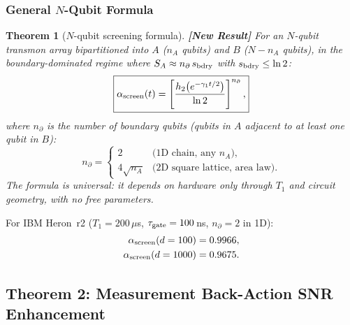 \documentclass[12pt,letterpaper]{article}
\newtheorem{theorem}{Theorem}[section]
\theoremstyle{definition}
\theoremstyle{remark}
\newcommand{\newresult}{\textbf{[New Result]}}
\newcommand{\ascreen}{\alpha_{\rm screen}}
\newcommand{\gammaone}{\gamma_{1}}
\begin{document}
\subsubsection{General \texorpdfstring{$N$}{N}-Qubit Formula}

\begin{theorem}[$N$-qubit screening formula] \label{thm:Nqubit}
\newresult{}
For an $N$-qubit transmon array bipartitioned into $A$ ($n_A$ qubits) and
$B$ ($N-n_A$ qubits), in the boundary-dominated regime where
$S_A \approx n_\partial\,s_{\rm bdry}$ with $s_{\rm bdry}\le\ln 2$:
\begin{equation}
\boxed{\ascreen(t) = \left[\frac{h_2\!\left(e^{-\gammaone t/2}\right)}{\ln 2}
  \right]^{n_\partial},}
\label{eq:alphaNqubit}
\end{equation}
where $n_\partial$ is the number of boundary qubits (qubits in $A$ adjacent to at least
one qubit in $B$):
\begin{equation}
n_\partial = \begin{cases}
  2 & \text{(1D chain, any $n_A$)}, \\
  4\sqrt{n_A} & \text{(2D square lattice, area law)}.
\end{cases}
\end{equation}
The formula is universal: it depends on hardware only through $T_1$ and circuit geometry,
with no free parameters.
\end{theorem}

For IBM Heron~r2 ($T_1 = 200\,\mu$s, $\tau_{\rm gate} = 100\,$ns,
$n_\partial = 2$ in 1D):
\begin{align}
\ascreen(d=100) &= 0.9966, \\
\ascreen(d=1000) &= 0.9675.
\end{align}

\subsection{Theorem 2: Measurement Back-Action SNR Enhancement}
\end{document}
